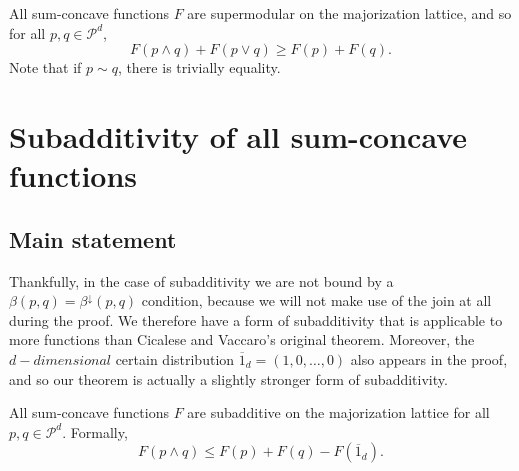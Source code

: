 \begin{conjecture} \label{conj:alternative_supermodularity}
    All sum-concave functions $F$ are supermodular on the majorization lattice, and so for all $p, q \in \mathcal{P}^d$,
    \begin{equation}
        F(p \wedge q) + F(p \vee q) \geq F(p) + F(q).
    \end{equation}
    Note that if $p \sim q$, there is trivially equality.
\end{conjecture}



\section{Subadditivity of all sum-concave functions} \label{sec:alternative_subadditivity}

\subsection{Main statement}

Thankfully, in the case of subadditivity we are not bound by a $\beta(p, q) = \beta^\downarrow(p, q)$ condition, because we will not make use of the join at all during the proof. We therefore have a form of subadditivity that is applicable to more functions than Cicalese and Vaccaro's original theorem. Moreover, the $d-dimensional$ certain distribution $\overline{1}_d = (1, 0, \dots, 0)$ also appears in the proof, and so our theorem is actually a slightly stronger form of subadditivity.

\begin{theorem} \label{th:alternative_subadditivity}
    All sum-concave functions $F$ are subadditive on the majorization lattice for all $p, q \in \mathcal{P}^d$. Formally,
    \begin{equation} \label{eq:subadditivity}
        F(p \wedge q) \leq F(p) + F(q) - F(\overline{1}_d).
    \end{equation}
\end{theorem}

